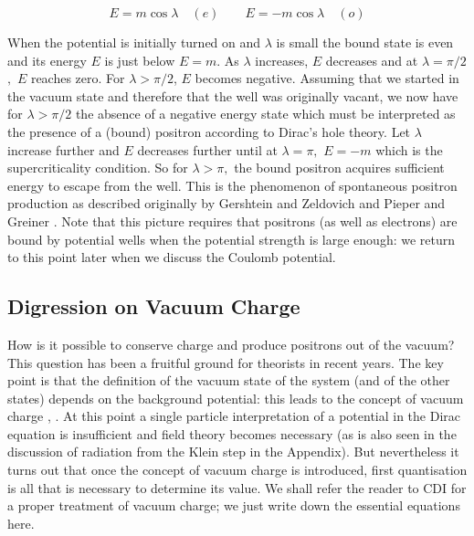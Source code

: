 \begin{equation}  \label{delta}
E=m\cos \lambda \quad (e)\qquad E=-m\cos \lambda \quad (o)
\end{equation}

\noindent When the potential is initially turned on and $\lambda $ is small
the bound state is even and its energy $E$ is just below $E=m$. As $\lambda $
increases, $E$ decreases and at $\lambda =\pi /2$ $,$ $E$ reaches zero. For $%
\lambda >\pi /2$, $E$ becomes negative. Assuming that we started in the
vacuum state and therefore that the well was originally vacant, we now have
for $\lambda >\pi /2$ the absence of a negative energy state which must be
interpreted as the presence of a (bound) positron according to Dirac's hole
theory. Let $\lambda $ increase further and $E$ decreases further until at $%
\lambda =\pi ,$ $E=-m$ which is the supercriticality condition. So for $%
\lambda >\pi ,$ the bound positron acquires sufficient energy to escape from
the well. This is the phenomenon of spontaneous positron production as
described originally by Gershtein and Zeldovich \cite{zeld} and Pieper and
Greiner \cite{grein2}. Note that this picture requires that positrons (as
well as electrons) are bound by potential wells when the potential strength
is large enough: we return to this point later when we discuss the Coulomb
potential.

\subsection{Digression on Vacuum Charge}

\noindent How is it possible to conserve charge and produce positrons out of
the vacuum? This question has been a fruitful ground for theorists in recent
years. The key point is that the definition of the vacuum state of the
system (and of the other states) depends on the background potential: this
leads to the concept of vacuum charge \cite{stone}, \cite{blank}. At this
point a single particle interpretation of a potential in the Dirac equation
is insufficient and field theory becomes necessary (as is also seen in the
discussion of radiation from the Klein step in the Appendix). But
nevertheless it turns out that once the concept of vacuum charge is
introduced, first quantisation is all that is necessary to determine its
value. We shall refer the reader to CDI for a proper treatment of vacuum
charge; we just write down the essential equations here.

\smallskip\ 

